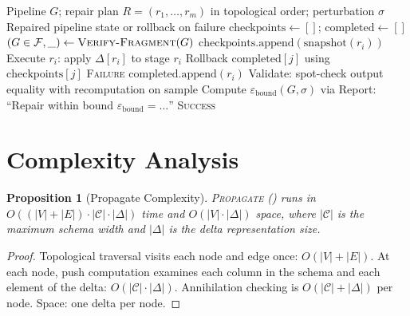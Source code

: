 \documentclass[11pt,a4paper]{article}
\newtheorem{proposition}[theorem]{Proposition}
\theoremstyle{definition}
\newcommand{\FragF}{\mathcal{F}}
\newcommand{\ebound}{\varepsilon_{\mathrm{bound}}}
\begin{document}
\begin{algorithm}[htbp]
\caption{\textsc{Execute-Repair}: Repair Plan Execution with Saga}
\label{alg:execute-repair}
\begin{algorithmic}[1]
\Require Pipeline $G$; repair plan $R = (r_1, \ldots, r_m)$ in topological order;
  perturbation $\sigma$
\Ensure Repaired pipeline state or rollback on failure
\State $\mathrm{checkpoints} \gets []$; $\mathrm{completed} \gets []$
\State $(G \in \FragF, \_) \gets \textsc{Verify-Fragment}(G)$
  \State $\mathrm{checkpoints}.\mathrm{append}(\mathrm{snapshot}(r_i))$
  \State Execute $r_i$: apply $\Delta[r_i]$ to stage $r_i$
     
      \State Rollback $\mathrm{completed}[j]$ using $\mathrm{checkpoints}[j]$
    \EndFor
    \State \Return \textsc{Failure}
  \EndIf
  \State $\mathrm{completed}.\mathrm{append}(r_i)$
\EndFor
\If{$G \in \FragF$}
  \State Validate: spot-check output equality with recomputation on sample
\Else
  \State Compute $\ebound(G, \sigma)$ via 
  \State Report: ``Repair within bound $\ebound = \ldots$''
\EndIf
\State \Return \textsc{Success}
\end{algorithmic}
\end{algorithm}


\section{Complexity Analysis}
\label{sec:complexity}

\begin{proposition}[Propagate Complexity]\label{prop:propagate-complexity}
\textsc{Propagate} () runs in
$O((|V| + |E|) \cdot |\mathcal{C}| \cdot |\Delta|)$ time and
$O(|V| \cdot |\Delta|)$ space, where $|\mathcal{C}|$ is the maximum schema
width and $|\Delta|$ is the delta representation size.
\end{proposition}
\begin{proof}
Topological traversal visits each node and edge once: $O(|V| + |E|)$.
At each node, push computation examines each column in the schema and each
element of the delta: $O(|\mathcal{C}| \cdot |\Delta|)$.
Annihilation checking is $O(|\mathcal{C}| + |\Delta|)$ per node.
Space: one delta per node.
\end{proof}
\end{document}

